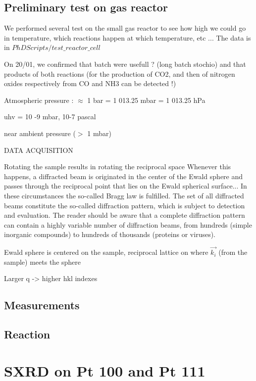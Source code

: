 \subsection{Preliminary test on gas reactor}

We performed several test on the small gas reactor to see how high we could go in temperature, which reactions happen at which temperature, etc ...
The data is in $PhDScripts/test\_reactor\_cell$

On 20/01, we confirmed that batch were usefull ?  (long batch stochio) and that products of both reactions (for the production of CO2, and then of nitrogen oxides respectively from CO and NH3 can be detected !)

Atmospheric pressure : $\approx$ 1 bar = 1 013.25 mbar = 1 013.25 hPa


uhv = 10 -9 mbar, 10-7 pascal

near ambient pressure ($>$ 1 mbar) 

DATA ACQUISITION

Rotating the sample results in rotating the reciprocal space
Whenever this happens, a diffracted beam is originated in the center of the Ewald sphere and passes through the reciprocal point that lies on the Ewald spherical surface... In these circumstances the so-called Bragg law is fulfilled. The set of all diffracted beams constitute the so-called diffraction pattern, which is subject to detection and evaluation. The reader should be aware that a complete diffraction pattern can contain a highly variable number of diffraction beams, from hundreds (simple inorganic compounds) to hundreds of thousands (proteins or viruses).
 
Ewald sphere is centered on the sample, reciprocal lattice on where $\vec{k_i}$ (from the sample) meets the sphere

Larger q -> higher hkl indexes

\subsection{Measurements}



\lipsum


\subsection{Reaction}


\lipsum



\section{SXRD on Pt 100 and Pt 111}
